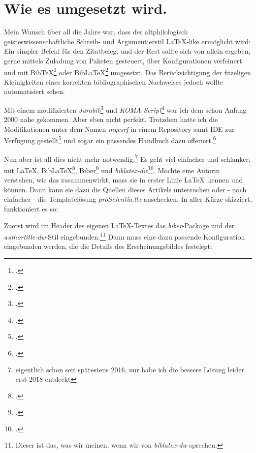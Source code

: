 
\section{Wie es umgesetzt wird.}

Mein Wunsch über all die Jahre war, dass der altphilologisch geisteswissenschaftliche Schreib- und Argumentierstil \LaTeX-like ermöglicht wird: Ein simpler Befehl für den Zitatbeleg, und der Rest sollte sich von allein
ergeben, gerne mittels Zuladung von Paketen gesteuert, über Konfigurationen
verfeinert und mit Bib\TeX\footcite[vgl.][]{BibtexOrgDe} oder Bib\LaTeX\footcite[vgl.][]{BibLaTeX2022a} umgesetzt. Das Berücksichtigung der fitzeligen Kleinigkeiten eines korrekten bibliographischen Nachweises jedoch wollte automatisiert sehen.

Mit einem modifizierten \emph{Jurabib}\footcite[vgl.][]{Berger2004a} und \emph{KOMA-Script}\footcite[vgl.][]{Kohm2008a} war ich dem schon Anfang 2000 nahe gekommen. Aber eben nicht perfekt. Trotzdem hatte ich die Modifikationen unter dem Namen \emph{mycsrf} in einem Repository samt IDE zur Verfügung gestellt\footcite[vgl.][]{Reincke2021a} und sogar ein passendes Handbuch dazu offeriert.\footcite[vgl.][]{Reincke2018a}

Nun aber ist all dies nicht mehr notwendig.\footnote{eigentlich schon seit spätestens 2016, nur habe ich die bessere Lösung leider erst 2018 entdeckt} Es geht viel einfacher und schlanker, mit \LaTeX, Bib\LaTeX\footcite[vgl.][]{BibLaTeX2022a},  Biber\footcite[vgl.][]{Biber2022a} und \emph{biblatex-dw}\footcite[vgl.][]{Waßenhoven2016a}. Möchte eine Autorin verstehen, wie das zusammenwirkt, muss sie in erster Linie \LaTeX\ kennen und können. Dann kann sie dazu die Quellen dieses Artikels untersuchen oder - noch einfacher - die Templatelösung \emph{proScientia.ltx} auschecken. In aller Kürze skizziert, funktioniert es so:

Zuerst wird im Header des eigenen \LaTeX-Textes das \emph{biber}-Package und der \emph{authortitle-dw}-Stil eingebunden.\footnote{Dieser ist das, was wir meinen, wenn wir von \emph{biblatex-dw} sprechen.} Dann muss eine dazu passende Konfiguration eingebunden werden, die die Details des Erscheinungsbildes festelegt:

